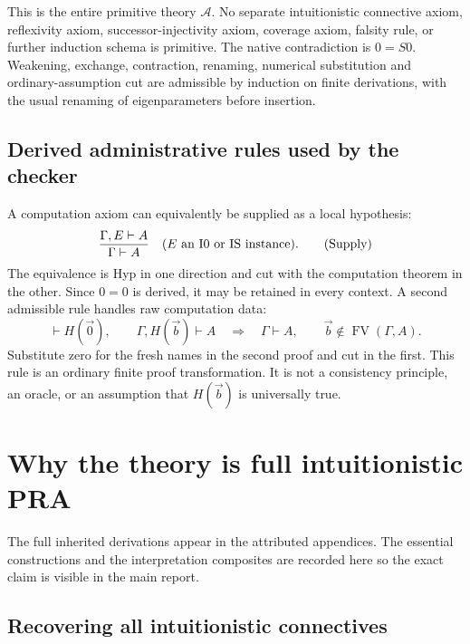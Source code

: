 \documentclass[11pt,letterpaper]{article}
\theoremstyle{definition}\newtheorem{definition}[theorem]{Definition}
\theoremstyle{remark}\newtheorem{remark}[theorem]{Remark}
\newcommand{\FV}{\operatorname{FV}}
\begin{document}
This is the entire primitive theory \(\mathcal A\). No separate
intuitionistic connective axiom, reflexivity axiom, successor-injectivity
axiom, coverage axiom, falsity rule, or further induction schema is
primitive. The native contradiction is \(0=S0\). Weakening, exchange,
contraction, renaming, numerical substitution and ordinary-assumption
cut are admissible by induction on finite derivations, with the usual
renaming of eigenparameters before insertion.

\subsection{Derived administrative rules used by the checker}

A computation axiom can equivalently be supplied as a local hypothesis:
\[
 \frac{\Gamma,E\vdash A}{\Gamma\vdash A}
 \quad(E\hbox{ an I0 or IS instance}).\tag{Supply}
\]
The equivalence is Hyp in one direction and cut with the computation
theorem in the other. Since \(0=0\) is derived, it may be retained in
every context. A second admissible rule handles raw computation data:
\[
 \vdash H(\vec0),\qquad \Gamma,H(\vec b)\vdash A
 \quad\Longrightarrow\quad\Gamma\vdash A,
 \qquad\vec b\notin\FV(\Gamma,A).
 \tag{Zero instance}
\]
Substitute zero for the fresh names in the second proof and cut in the
first. This rule is an ordinary finite proof transformation. It is not
a consistency principle, an oracle, or an assumption that \(H(\vec b)\)
is universally true.

\section{Why the theory is full intuitionistic PRA}
\label{sec:bridge-summary}

The full inherited derivations appear in the attributed appendices.
The essential constructions and the interpretation composites are
recorded here so the exact claim is visible in the main report.

\subsection{Recovering all intuitionistic connectives}
\end{document}
